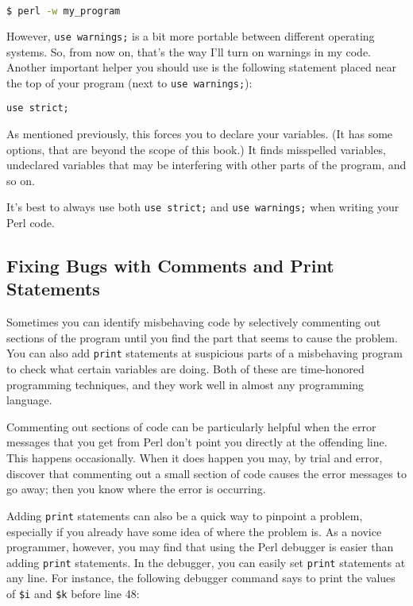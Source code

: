 \begin{lstlisting}[language=bash]
$ perl -w my_program
\end{lstlisting}

However, \verb|use warnings;| is a bit more portable between different operating systems. So, from now on, that's the way I'll turn on warnings in my code. Another important helper you should use is the following statement placed near the top of your program (next to \verb|use warnings;|):

\begin{lstlisting}
use strict;
\end{lstlisting}

As mentioned previously, this forces you to declare your variables. (It has some options, that are beyond the scope of this book.) It finds misspelled variables, undeclared variables that may be interfering with other parts of the program, and so on. 

\begin{adjustwidth}{2cm}{2cm}
  It's best to always use both \verb|use strict;| and \verb|use warnings;| when writing your Perl code. 
\end{adjustwidth}

\subsection{Fixing Bugs with Comments and Print Statements}
Sometimes you can identify misbehaving code by selectively commenting out sections of the program until you find the part that seems to cause the problem. You can also add \verb|print| statements at suspicious parts of a misbehaving program to check what certain variables are doing. Both of these are time-honored programming techniques, and they work well in almost any programming language.

Commenting out sections of code can be particularly helpful when the error messages that you get from Perl don't point you directly at the offending line. This happens occasionally. When it does happen you may, by trial and error, discover that commenting out a small section of code causes the error messages to go away; then you know where the error is occurring.

Adding \verb|print| statements can also be a quick way to pinpoint a problem, especially if you already have some idea of where the problem is. As a novice programmer, however, you may find that using the Perl debugger is easier than adding \verb|print| statements. In the debugger, you can easily set \verb|print| statements at any line. For instance, the following debugger command says to print the values of \verb|$i| and \verb|$k| before line 48:

